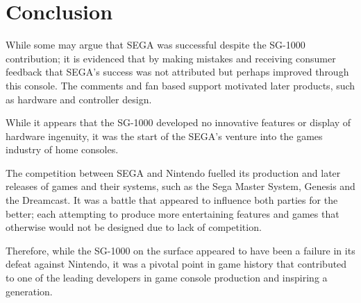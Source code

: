 \documentclass{scrartcl}
\begin{document}
	\section{Conclusion}

While some may argue that SEGA was successful despite the SG-1000 contribution; it is evidenced that by making mistakes and receiving consumer feedback that SEGA’s success was not attributed but perhaps improved through this console. The comments and fan based support motivated later products, such as hardware and controller design.

While it appears that the SG-1000 developed no innovative features or display of hardware ingenuity, it was the start of the SEGA’s venture into the games industry of home consoles.

The competition between SEGA and Nintendo fuelled its production and later releases of games and their systems, such as the Sega Master System, Genesis and the Dreamcast. It was a battle that appeared to influence both parties for the better; each attempting to produce more entertaining features and games that otherwise would not be designed due to lack of competition.

Therefore, while the SG-1000 on the surface appeared to have been a failure in its defeat against Nintendo, it was a pivotal point in game history that contributed to one of the leading developers in game console production and inspiring a generation.

	
	\newpage
	
	
	
			
\end{document}
